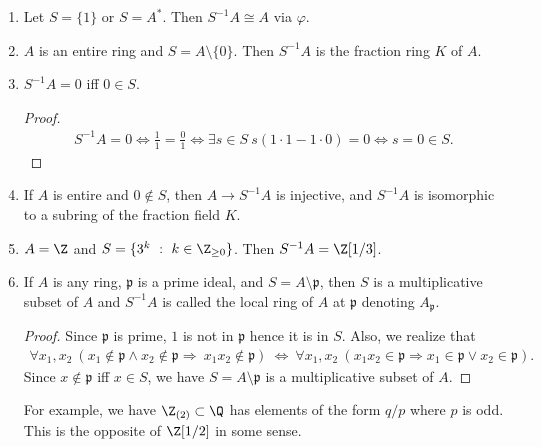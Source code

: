 \begin{example}\noindent
    \begin{enumerate}
        \item Let $S = \{1\}$ or $S = A^*$. Then $S^{-1}A \cong A$ via $\varphi$.
        \item $A$ is an entire ring and $S = A\setminus \{0\}$. Then $S^{-1}A$ is the fraction ring $K$ of $A$.
        \item $S^{-1}A = 0$ iff $0 \in S$.
        \begin{proof}
            \begin{align*}
                S^{-1}A = 0 \Leftrightarrow \frac{1}{1} = \frac{0}{1} \Leftrightarrow \exists s \in S \ s(1\cdot 1 - 1\cdot 0) = 0 \Leftrightarrow s = 0 \in S.
            \end{align*}
        \end{proof}
        \item If $A$ is entire and $0 \notin S$, then $A \rightarrow S^{-1}A$ is injective, and $S^{-1}A$ is isomorphic to a subring of the fraction field $K$.
        \item $A = \Z$ and $S = \{3^k \ : \ k \in \Z_{\geq 0}\}$. Then $S^{-1}A = \Z[1/3]$.
        \item If $A$ is any ring, $\mathfrak{p}$ is a prime ideal, and $S = A \setminus \mathfrak{p}$, then $S$ is a multiplicative subset of $A$ and $S^{-1}A$ is called the local ring of $A$ at $\mathfrak{p}$ denoting $A_{\mathfrak{p}}$.
        \begin{proof}
            Since $\mathfrak{p}$ is prime, $1$ is not in $\mathfrak{p}$ hence it is in $S$. Also, we realize that
            \begin{align*}
                \forall x_1, x_2 \ (x_1 \notin \mathfrak{p} \wedge x_2 \notin \mathfrak{p} \Rightarrow \ x_1x_2 \notin \mathfrak{p}) \ \Leftrightarrow \ \forall x_1, x_2 \ (x_1x_2 \in \mathfrak{p} \Rightarrow x_1\in \mathfrak{p} \lor x_2 \in \mathfrak{p}).
            \end{align*}
            Since $x \notin \mathfrak{p}$ iff $x \in S$, we have $S = A \setminus \mathfrak{p}$ is a multiplicative subset of $A$.
        \end{proof}
        For example, we have $\Z_{(2)} \subset \Q$ has elements of the form $q/p$ where $p$ is odd. This is the opposite of $\Z[1/2]$ in some sense.
    \end{enumerate}
\end{example}


